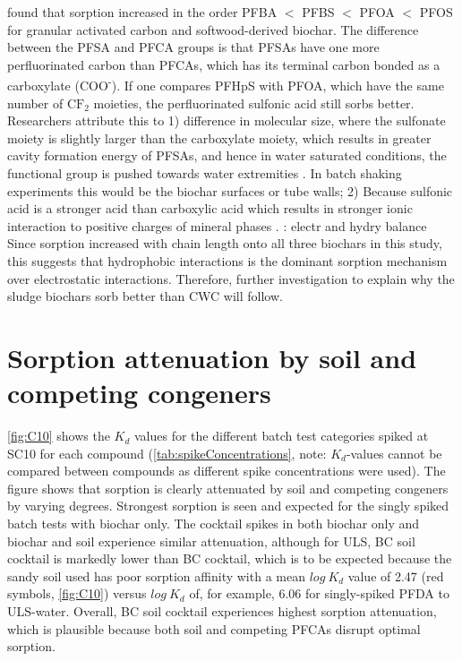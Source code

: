 \cite{zhang2021sorption} found that sorption increased in the order PFBA $<$ PFBS $<$ PFOA $<$ PFOS for granular activated carbon and softwood-derived biochar. The difference between the PFSA and PFCA groups is that PFSAs have one more perfluorinated carbon than PFCAs, which has its terminal carbon bonded as a carboxylate (COO\textsuperscript{-}). If one compares PFHpS with PFOA, which have the same number of $\mathrm{CF_2}$ moieties, the perfluorinated sulfonic acid still sorbs better. Researchers attribute this to 1) difference in molecular size, where the sulfonate moiety is slightly larger than the carboxylate moiety, which results in greater cavity formation energy of PFSAs, and hence in water saturated conditions, the functional group is pushed towards water extremities \citep{yin2022insights,sigmund2022sorption}. In batch shaking experiments this would be the biochar surfaces or tube walls; 2) Because sulfonic acid is a stronger acid than carboxylic acid which results in stronger ionic interaction to positive charges of mineral phases \citep{arvaniti2015review}. \cite{du2014adsorption}: electr and hydry balance Since sorption increased with chain length onto all three biochars in this study, this suggests that hydrophobic interactions is the dominant sorption mechanism over electrostatic interactions. Therefore, further investigation to explain why the sludge biochars sorb better than CWC will follow. 


\section{Sorption attenuation by soil and competing congeners}
\cref{fig:C10} shows the $K_d$ values for the different batch test categories spiked at SC10 for each compound (\cref{tab:spikeConcentrations}, note: $K_d$-values cannot be compared between compounds as different spike concentrations were used). The figure shows that sorption is clearly attenuated by soil and competing congeners by varying degrees. Strongest sorption is seen and expected for the singly spiked batch tests with biochar only. The cocktail spikes in both biochar only and biochar and soil experience similar attenuation, although for ULS, BC soil cocktail is markedly lower than  BC cocktail, which is to be expected because the sandy soil used has poor sorption affinity with a mean $log~K_d$ value of 2.47 (red symbols, \cref{fig:C10}) versus $log~K_d$ of, for example, 6.06 for singly-spiked PFDA to ULS-water. Overall, BC soil cocktail experiences highest sorption attenuation, which is plausible because both soil and competing PFCAs disrupt optimal sorption. 

